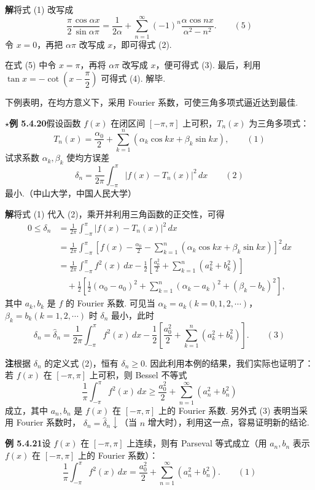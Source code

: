 \documentclass[UTF8,12pt,a4paper,fontset=fandol]{ctexart}
\begin{document}
\noindent\textbf{解}\quad 将式 (1) 改写成
\[
  \frac{\pi}{2}\frac{\cos\alpha x}{\sin\alpha\pi}
  =\frac1{2\alpha}+\sum_{n=1}^{\infty}(-1)^n\frac{\alpha\cos nx}{\alpha^2-n^2}. \qquad(5)
\]
令 $x=0$，再把 $\alpha\pi$ 改写成 $x$，即可得式 (2).

在式 (5) 中令 $x=\pi$，再将 $\alpha\pi$ 改写成 $x$，便可得式 (3). 最后，利用
$\tan x=-\cot\left(x-\dfrac{\pi}{2}\right)$ 可得式 (4). 解毕.

下例表明，在均方意义下，采用 Fourier 系数，可使三角多项式逼近达到最佳.

\noindent\(\star\)\textbf{例 5.4.20}\quad 假设函数 $f(x)$ 在闭区间 $[-\pi,\pi]$ 上可积，$T_n(x)$ 为三角多项式：
\[
  T_n(x)=\frac{\alpha_0}{2}+\sum_{k=1}^{n}(\alpha_k\cos kx+\beta_k\sin kx), \qquad(1)
\]
试求系数 $\alpha_k,\beta_k$ 使均方误差
\[
  \delta_n=\frac1{2\pi}\int_{-\pi}^{\pi}|f(x)-T_n(x)|^2\,dx \qquad(2)
\]
最小.（中山大学，中国人民大学）

\noindent\textbf{解}\quad 将式 (1) 代入 (2)，乘开并利用三角函数的正交性，可得
\[
\begin{aligned}
0\le\delta_n
&=\frac1{2\pi}\int_{-\pi}^{\pi}|f(x)-T_n(x)|^2\,dx\\
&=\frac1{2\pi}\int_{-\pi}^{\pi}
\left[f(x)-\frac{\alpha_0}{2}-\sum_{k=1}^{n}(\alpha_k\cos kx+\beta_k\sin kx)\right]^2dx\\
&=\frac1{2\pi}\int_{-\pi}^{\pi}f^2(x)\,dx
-\frac12\left[\frac{a_0^2}{2}+\sum_{k=1}^{n}(a_k^2+b_k^2)\right]\\
&\quad+\frac12\left[\frac12(\alpha_0-a_0)^2
+\sum_{k=1}^{n}(\alpha_k-a_k)^2+(\beta_k-b_k)^2\right],
\end{aligned}
\]
其中 $a_k,b_k$ 是 $f$ 的 Fourier 系数. 可见当
$\alpha_k=a_k(k=0,1,2,\cdots)$，$\beta_k=b_k(k=1,2,\cdots)$ 时
$\delta_n$ 最小，此时
\[
  \delta_n=\hat\delta_n=\frac1{2\pi}\int_{-\pi}^{\pi}f^2(x)\,dx
  -\frac12\left[\frac{a_0^2}{2}+\sum_{k=1}^{n}(a_k^2+b_k^2)\right]. \qquad(3)
\]

\noindent\textbf{注}\quad 根据 $\delta_n$ 的定义式 (2)，恒有 $\delta_n\ge0$. 因此利用本例的结果，我们实际也证明了：若 $f(x)$ 在 $[-\pi,\pi]$ 上可积，则 Bessel 不等式
\[
  \frac1\pi\int_{-\pi}^{\pi}f^2(x)\,dx\ge
  \frac{a_0^2}{2}+\sum_{n=1}^{\infty}(a_n^2+b_n^2)
\]
成立，其中 $a_n,b_n$ 是 $f(x)$ 在 $[-\pi,\pi]$ 上的 Fourier 系数. 另外式 (3) 表明当采用 Fourier 系数时，
$\delta_n=\hat\delta_n\downarrow$（当 $n$ 增大时），利用这一点，容易证明新的结论.

\noindent\textbf{例 5.4.21}\quad 设 $f(x)$ 在 $[-\pi,\pi]$ 上连续，则有 Parseval 等式成立（用 $a_n,b_n$ 表示 $f(x)$ 在 $[-\pi,\pi]$ 上的 Fourier 系数）：
\[
  \frac1\pi\int_{-\pi}^{\pi}f^2(x)\,dx
  =\frac{a_0^2}{2}+\sum_{n=1}^{\infty}(a_n^2+b_n^2). \qquad(1)
\]
\end{document}
